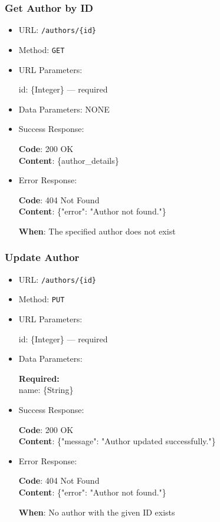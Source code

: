 \subsubsection*{Get Author by ID}

\begin{itemize}
    \item URL: \texttt{/authors/\{id\}}
    \item Method: \texttt{GET}
    \item URL Parameters:

    id: \{Integer\} — required

    \item Data Parameters: NONE

    \item Success Response: \newline

    \textbf{Code}: 200 OK \\
    \textbf{Content}: \{author\_details\}

    \item Error Response: \newline

    \textbf{Code}: 404 Not Found \\
    \textbf{Content}: \{"error": "Author not found."\}

    \textbf{When}: The specified author does not exist
\end{itemize}

\subsubsection*{Update Author}

\begin{itemize}
    \item URL: \texttt{/authors/\{id\}}
    \item Method: \texttt{PUT}
    \item URL Parameters:

    id: \{Integer\} — required

    \item Data Parameters:

    \textbf{Required:} \\
    name: \{String\}

    \item Success Response: \newline

    \textbf{Code}: 200 OK \\
    \textbf{Content}: \{"message": "Author updated successfully."\}

    \item Error Response: \newline

    \textbf{Code}: 404 Not Found \\
    \textbf{Content}: \{"error": "Author not found."\}

    \textbf{When}: No author with the given ID exists
\end{itemize}

